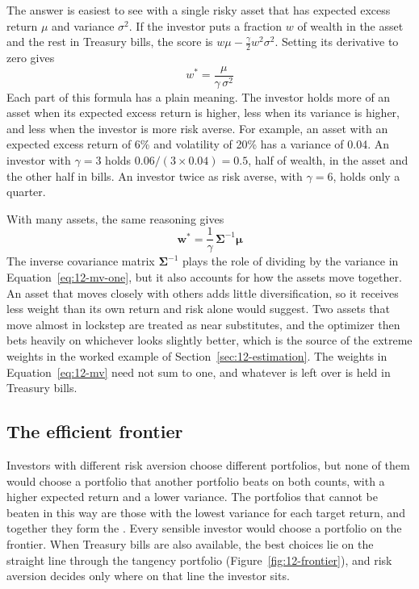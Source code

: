 The answer is easiest to see with a single risky asset that has expected excess return $\mu$ and variance $\sigma^2$. If the investor puts a fraction $w$ of wealth in the asset and the rest in Treasury bills, the score is $w\mu - \tfrac{\gamma}{2} w^2 \sigma^2$. Setting its derivative to zero gives
\begin{equation}
  w^* = \frac{\mu}{\gamma\,\sigma^2}
  \label{eq:12-mv-one}
\end{equation}
Each part of this formula has a plain meaning. The investor holds more of an asset when its expected excess return is higher, less when its variance is higher, and less when the investor is more risk averse. For example, an asset with an expected excess return of 6\% and volatility of 20\% has a variance of 0.04. An investor with $\gamma = 3$ holds $0.06/(3 \times 0.04) = 0.5$, half of wealth, in the asset and the other half in bills. An investor twice as risk averse, with $\gamma = 6$, holds only a quarter.

With many assets, the same reasoning gives
\begin{equation}
  \mathbf{w}^* = \frac{1}{\gamma}\,\boldsymbol{\Sigma}^{-1}\boldsymbol{\mu}
  \label{eq:12-mv}
\end{equation}
The inverse covariance matrix $\boldsymbol{\Sigma}^{-1}$ plays the role of dividing by the variance in Equation~\eqref{eq:12-mv-one}, but it also accounts for how the assets move together. An asset that moves closely with others adds little diversification, so it receives less weight than its own return and risk alone would suggest. Two assets that move almost in lockstep are treated as near substitutes, and the optimizer then bets heavily on whichever looks slightly better, which is the source of the extreme weights in the worked example of Section~\ref{sec:12-estimation}. The weights in Equation~\eqref{eq:12-mv} need not sum to one, and whatever is left over is held in Treasury bills.

\subsection{The efficient frontier}
\label{sec:12-frontier}

Investors with different risk aversion choose different portfolios, but none of them would choose a portfolio that another portfolio beats on both counts, with a higher expected return and a lower variance. The portfolios that cannot be beaten in this way are those with the lowest variance for each target return, and together they form the . Every sensible investor would choose a portfolio on the frontier. When Treasury bills are also available, the best choices lie on the straight line through the tangency portfolio (Figure~\ref{fig:12-frontier}), and risk aversion decides only where on that line the investor sits.

